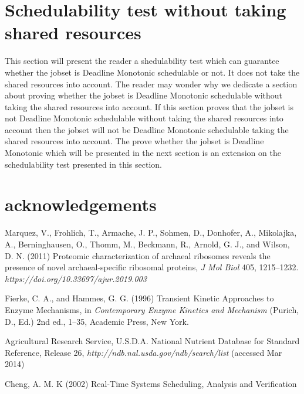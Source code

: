 \documentclass[10pt]{article}
\begin{document}
\section{Schedulability test without taking shared resources}

This section will present the reader a shedulability test which can guarantee whether the jobset is Deadline Monotonic schedulable or not.
It does not take the shared resources into account.
The reader may wonder why we dedicate a section about proving whether the jobset is Deadline Monotonic schedulable without taking the shared resources into account.
If this section proves that the jobset is not Deadline Monotonic schedulable without taking the shared resources into account then the jobset will not be Deadline Monotonic schedulable taking the shared resources into account.
The prove whether the jobset is Deadline Monotonic which will be presented in the next section is an extension on the schedulability test presented in this section.




\section*{acknowledgements}

\begin{thebibliography}{9} %

 Marquez, V., Frohlich, T., Armache, J. P., Sohmen, D., Donhofer, A., Mikolajka, A., Berninghausen, O., Thomm, M., Beckmann, R., Arnold, G. J., and Wilson, D. N. (2011) Proteomic characterization of archaeal ribosomes reveals the presence of novel archaeal-specific ribosomal proteins, \textit{J Mol Biol} 405, 1215--1232. \textit {https://doi.org/10.33697/ajur.2019.003}


 Fierke, C. A., and Hammes, G. G. (1996) Transient Kinetic Approaches to Enzyme Mechanisms, in \textit{Contemporary Enzyme Kinetics and Mechanism} (Purich, D., Ed.) 2nd ed., 1--35, Academic Press, New York.

 Agricultural Research Service, U.S.D.A. National Nutrient Database for Standard Reference, Release 26, \textit{http://ndb.nal.usda.gov/ndb/search/list} (accessed Mar 2014)

 Cheng, A. M. K (2002) Real-Time Systems Scheduling, Analysis and Verification
\end{thebibliography}
\end{document}
